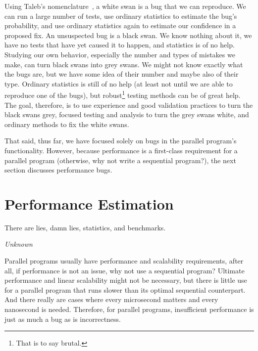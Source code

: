 Using Taleb's nomenclature~\cite{NassimTaleb2007BlackSwan},
a white swan is a bug that we can reproduce.
We can run a large number of tests, use ordinary statistics to
estimate the bug's probability, and use ordinary statistics again
to estimate our confidence in a proposed fix.
An unsuspected bug is a black swan.
We know nothing about it, we have no tests that have yet caused it
to happen, and statistics is of no help.
Studying our own behavior, especially the number and types of mistakes
we make, can turn black swans into grey swans.
We might not know exactly what the bugs are, but we have some idea of
their number and maybe also of their type.
Ordinary statistics is still of no help (at least not until we are
able to reproduce one of the bugs), but robust\footnote{
	That is to say brutal.}
testing methods can be of great help.
The goal, therefore, is to use experience and good validation practices
to turn the black swans grey, focused testing and analysis to turn the
grey swans white, and ordinary methods to fix the white swans.

That said, thus far, we have focused solely on bugs in the parallel program's
functionality.
However, because performance is a first-class requirement for a
parallel program (otherwise, why not write a sequential program?),
the next section discusses performance bugs.

\section{Performance Estimation}
\label{sec:debugging:Performance Estimation}
%
\epigraph{There are lies, damn lies, statistics, and benchmarks.}
	 {\emph{Unknown}}

Parallel programs usually have performance and scalability requirements,
after all, if performance is not an issue, why not use a sequential
program?
Ultimate performance and linear scalability might not be necessary, but
there is little use for a parallel program that runs slower than its
optimal sequential counterpart.
And there really are cases where every microsecond matters and every
nanosecond is needed.
Therefore, for parallel programs, insufficient performance is just as
much a bug as is incorrectness.

